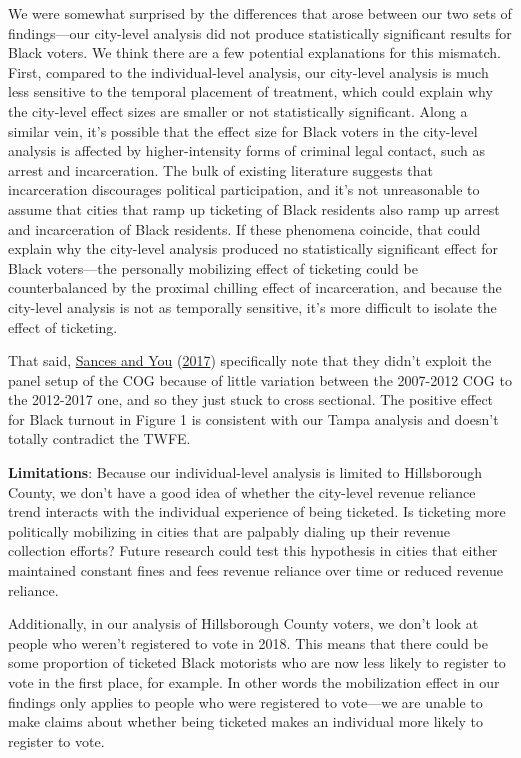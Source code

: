 \documentclass[
  12pt,
]{article}
\begin{document}
We were somewhat surprised by the differences that arose between our two sets of findings---our city-level analysis did not produce statistically significant results for Black voters. We think there are a few potential explanations for this mismatch. First, compared to the individual-level analysis, our city-level analysis is much less sensitive to the temporal placement of treatment, which could explain why the city-level effect sizes are smaller or not statistically significant. Along a similar vein, it's possible that the effect size for Black voters in the city-level analysis is affected by higher-intensity forms of criminal legal contact, such as arrest and incarceration. The bulk of existing literature suggests that incarceration discourages political participation, and it's not unreasonable to assume that cities that ramp up ticketing of Black residents also ramp up arrest and incarceration of Black residents. If these phenomena coincide, that could explain why the city-level analysis produced no statistically significant effect for Black voters---the personally mobilizing effect of ticketing could be counterbalanced by the proximal chilling effect of incarceration, and because the city-level analysis is not as temporally sensitive, it's more difficult to isolate the effect of ticketing.

That said, \protect\hyperlink{ref-Sances2017}{Sances and You} (\protect\hyperlink{ref-Sances2017}{2017}) specifically note that they didn't exploit the panel setup of the COG because of little variation between the 2007-2012 COG to the 2012-2017 one, and so they just stuck to cross sectional. The positive effect for Black turnout in Figure 1 is consistent with our Tampa analysis and doesn't totally contradict the TWFE.

\textbf{Limitations}: Because our individual-level analysis is limited to Hillsborough County, we don't have a good idea of whether the city-level revenue reliance trend interacts with the individual experience of being ticketed. Is ticketing more politically mobilizing in cities that are palpably dialing up their revenue collection efforts? Future research could test this hypothesis in cities that either maintained constant fines and fees revenue reliance over time or reduced revenue reliance.

Additionally, in our analysis of Hillsborough County voters, we don't look at people who weren't registered to vote in 2018. This means that there could be some proportion of ticketed Black motorists who are now less likely to register to vote in the first place, for example. In other words the mobilization effect in our findings only applies to people who were registered to vote---we are unable to make claims about whether being ticketed makes an individual more likely to register to vote.
\end{document}
